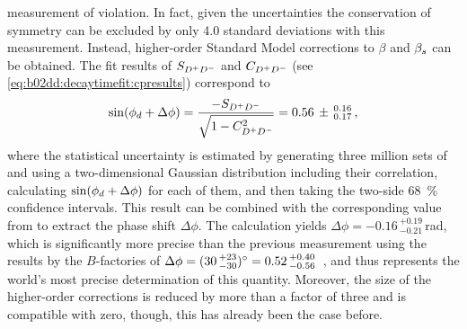 measurement of \CP violation. In fact, given the uncertainties the
conservation of \CP symmetry can be excluded by only \num{4.0} standard
deviations with this measurement. Instead, higher-order Standard Model
corrections to $\beta$ and $\betas$ can be obtained. The fit results of $\SDD$
and $\CDD$ (see \cref{eq:b02dd:decaytimefit:cpresults}) correspond to
\begin{align*}
  \sin(\phid + \Delta \phi) = \frac{-\SDD}{\sqrt{1 - \CDD^2}} = 0.56\,\pm\,^{0.16}_{0.17}\,,
\end{align*}
where the statistical uncertainty is estimated by generating three million
sets of \SDD and \CDD using a two-dimensional Gaussian distribution including
their correlation, calculating $\sin(\phid + \Delta \phi)$ for each of them,
and then taking the two-side \SI{68}{\percent} confidence intervals. This
result can be combined with the corresponding value from \BdToJPsiKS to
extract the phase shift $\Delta \phi$. The calculation yields $\Delta \phi =
-0.16\,^{+0.19}_{-0.21}$\,\si{\radian}, which is significantly more precise
than the previous measurement using the results by the $B$-factories of
$\Delta \phi = (30\,^{+23}_{-30})\si{\degrees} =
0.52\,^{+0.40}_{-0.56}$~\cite{Bel:2015wha}, and thus represents the world's
most precise determination of this quantity. Moreover, the size of the
higher-order corrections is reduced by more than a factor of three and is
compatible with zero, though, this has already been the case before.
